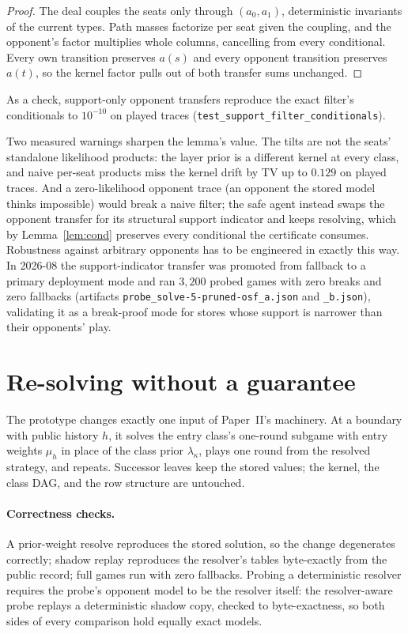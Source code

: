 \documentclass[11pt]{article}
\theoremstyle{plain}
\theoremstyle{definition}
\theoremstyle{remark}
\newcommand{\code}[1]{\texttt{\small #1}}
\begin{document}
\begin{proof}
The deal couples the seats only through $(a_0,a_1)$, deterministic
invariants of the current types. Path masses factorize per seat given
the coupling, and the opponent's factor multiplies whole columns,
cancelling from every conditional. Every own transition preserves
$a(s)$ and every opponent transition preserves $a(t)$, so the kernel
factor pulls out of both transfer sums unchanged.
\end{proof}

As a check, support-only opponent transfers reproduce the exact
filter's conditionals to $10^{-10}$ on played traces
(\code{test\_support\_filter\_conditionals}).

Two measured warnings sharpen the lemma's value. The tilts are not the
seats' standalone likelihood products: the layer prior is a different
kernel at every class, and naive per-seat products miss the kernel
drift by TV up to $0.129$ on played traces. And a zero-likelihood
opponent trace (an opponent the stored model thinks impossible) would
break a naive filter; the safe agent instead swaps the opponent
transfer for its structural support indicator and keeps resolving,
which by Lemma~\ref{lem:cond} preserves every conditional the
certificate consumes. Robustness against arbitrary opponents has to be
engineered in exactly this way. In 2026-08 the support-indicator
transfer was promoted from fallback to a primary deployment mode and
ran $3{,}200$ probed games with zero breaks and zero fallbacks
(artifacts \code{probe\_solve-5-pruned-osf\_a.json} and
\code{\_b.json}), validating it as a break-proof mode for stores
whose support is narrower than their opponents' play.

\section{Re-solving without a guarantee}\label{sec:unsafe}

The prototype changes exactly one input of Paper~II's machinery. At a
boundary with public history $h$, it solves the entry class's
one-round subgame with entry weights $\mu_h$ in place of the class
prior $\lambda_\kappa$, plays one round from the resolved strategy,
and repeats. Successor leaves keep the stored values; the kernel, the
class DAG, and the row structure are untouched.

\paragraph{Correctness checks.} A prior-weight resolve reproduces the
stored solution, so the change degenerates correctly; shadow replay
reproduces the resolver's tables byte-exactly from the public record;
full games run with zero fallbacks. Probing a deterministic resolver
requires the probe's opponent model to be the resolver itself: the
resolver-aware probe replays a deterministic shadow copy, checked to
byte-exactness, so both sides of every comparison hold equally exact
models.
\end{document}
